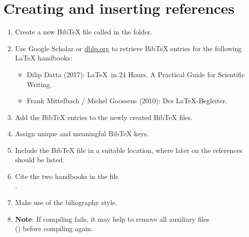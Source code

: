 \section{Creating and inserting references}

\begin{enumerate}
  \item Create a new Bib\TeX{} file called  in the  folder.
  \item Use Google Scholar or \url{dblp.org} to retrieve Bib\TeX{} entries for the following \LaTeX{}
  handbooks:
  \begin{itemize}
    \item Dilip Datta (2017): \LaTeX\ in 24 Hours. A Practical Guide for Scientific Writing.
    \item Frank Mittelbach / Michel Goossens (2010): Der \LaTeX-Begleiter.
  \end{itemize}
  \item Add the Bib\TeX{} entries to the newly created Bib\TeX{} files.
  \item Assign unique and meaningful Bib\TeX{} keys.
  \item Include the Bib\TeX{} file in a suitable location, where later on the references should be listed.
  \item Cite the two handbooks in the 
  file\\.
  \item Make use of the  biliography style.
  \item \textbf{Note}: If compiling fails, it may help to remove all auxiliary 
  files \\() before compiling again.
\end{enumerate}
